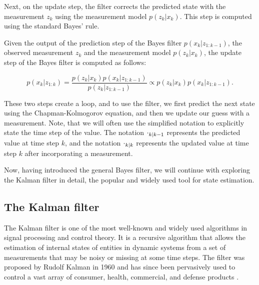 Next, on the update step, the filter corrects the predicted state with the 
measurement $z_k$ using the measurement model $p(z_k | x_k)$. This step is
computed using the standard Bayes' rule.

\begin{theorem}\label{theorem:bayes-filter-update}
    Given the output of the prediction step of the Bayes filter 
    $p\left({x}_k | {z}_{1: k-1}\right)$, the observed measurement $z_k$
    and the measurement model $p(z_k | x_k)$, the update step of the Bayes
    filter is computed as follows:
    
    \begin{equation}
        p\left({x}_k | {z}_{1: k}\right)=\frac{p\left({z}_k | {x}_k\right) p\left({x}_k | {z}_{1: k-1}\right)}{p\left({z}_k | {z}_{1: k-1}\right)} \propto p\left({z}_k | {x}_k\right) p\left({x}_k | {z}_{1: k-1}\right).
    \end{equation}
\end{theorem}

These two steps create a loop, and to use the filter, we first predict the next state using the Chapman-Kolmogorov equation, and then we update our guess with a measurement. Note, that we will often use the simplified notation to explicitly state the time step of the value. The notation $\vecat{\cdot}{k|k-1}$ represents the predicted value at time step $k$, and the notation $\vecat{\cdot}{k|k}$ represents the updated value at time step $k$ after incorporating a measurement.

Now, having introduced the general Bayes filter, we will continue with 
exploring the Kalman filter in detail, the popular and widely used tool for 
state estimation.

\subsection{The Kalman filter}

The Kalman filter is one of the most well-known and widely used algorithms in 
signal processing and control theory. It is a recursive algorithm that allows 
the estimation of internal states of entities in dynamic systems from a set of 
measurements that may be noisy or missing at some time steps. The filter was 
proposed by Rudolf Kalman in 1960 \cite{kalmanNewApproachLinear1960} and has 
since been pervasively used to control a vast array of consumer, health, 
commercial, and defense products \cite{grewalApplicationsKalmanFiltering2010}.

